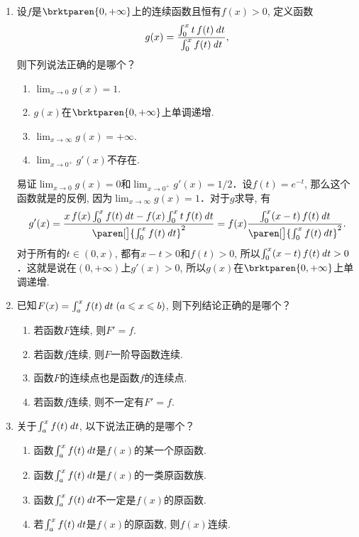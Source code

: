 \begin{enumerate}
\item 设\(f\)是\(\brktparen{0,+\infty}\)上的连续函数且恒有\(f(x) > 0\), 定义函数
  \[
    g(x) = \frac{\int_0^x t\,f(t) \mathop{}\!\mathit{d} t}{\int_0^x f(t) \mathop{}\!\mathit{d} t},
  \]
  则下列说法正确的是哪个？
  \begin{enumerate}
  \item \(\displaystyle \lim_{x\to0} g(x) = 1\).
  \item \(g(x)\)在\(\brktparen{0,+\infty}\)上单调递增.
  \item \(\displaystyle \lim_{x\to\infty} g(x) = +\infty\).
  \item \(\displaystyle \lim_{x\to0^+} g'(x)\)不存在.
  \end{enumerate}

  \ifshowsol
    易证\(\lim_{x\to0} g(x) = 0\)和\(\lim_{x\to0^+} g'(x) = 1/2\)．设\(f(t) = e^{-t}\), 那么这个函数就是的反例, 因为\(\lim_{x\to\infty} g(x) = 1\)．对于\(g\)求导, 有
    \[
      g'(x) = \frac{x\,f(x) \int_0^x f(t) \dt - f(x) \int_0^x t\,f(t) \dt}{\paren[\big]{\int_0^x f(t) \dt}^2}
      = f(x) \frac{\int_0^x (x-t)\,f(t) \dt}{\paren[\big]{\int_0^x f(t) \dt}^2}.
    \]
    对于所有的\(t \in (0, x)\), 都有\(x - t > 0\)和\(f(t) > 0\), 所以\(\int_0^x (x-t)\,f(t) \mathop{}\!\mathit{d} t > 0\)．这就是说在\((0,+\infty)\)上\(g'(x) > 0\), 所以\(g(x)\)在\(\brktparen{0,+\infty}\)上单调递增.
  \fi

\item 已知\(F(x) = \int_a^x f(t) \dt \; (a \le x \le b)\), 则下列结论正确的是哪个？
  \begin{enumerate}
  \item 若函数\(F\)连续, 则\(F' = f\).
  \item 若函数\(f\)连续, 则\(F\)一阶导函数连续.
  \item 函数\(F\)的连续点也是函数\(f\)的连续点.
  \item 若函数\(f\)连续, 则不一定有\(F' = f\).
  \end{enumerate}

\item 关于\(\int_a^x f(t) \mathop{}\!\mathit{d} t\), 以下说法正确的是哪个？
  \begin{enumerate}
  \item 函数\(\int_a^x f(t) \mathop{}\!\mathit{d} t\)是\(f(x)\)的某一个原函数.
  \item 函数\(\int_a^x f(t) \mathop{}\!\mathit{d} t\)是\(f(x)\)的一类原函数族.
  \item 函数\(\int_a^x f(t) \mathop{}\!\mathit{d} t\)不一定是\(f(x)\)的原函数.
  \item 若\(\int_a^x f(t) \mathop{}\!\mathit{d} t\)是\(f(x)\)的原函数, 则\(f(x)\)连续.
  \end{enumerate}


\end{enumerate}
